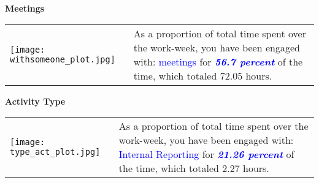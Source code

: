 \documentclass[a4paper]{article}
\begin{document}
\newpage

\begin{center}
\Large{\textbf{Meetings}}
 \end{center}

\begin{table}[h!]
     \begin{center}
     \begin{tabular}{m{10cm} m{7cm}}
     \begin {minipage} {10cm}
     \texttt{[image: withsomeone\_plot.jpg]}
     \end{minipage}
      & 
      \begin{minipage}{7cm}
      \Large{As a proportion of total time spent over the work-week, you have been engaged with: \textcolor{blue}{meetings} for \textbf{\textcolor{blue}{\emph{56.7 percent}}} of the time, which totaled 72.05 hours.}
      \end{minipage}
      \end{tabular}
      \end{center}
      \end{table}

\begin{center}
\Large{\textbf{Activity Type}}
 \end{center}
\begin{table}[h!]
     \begin{center}
     \begin{tabular}{m{10cm} m{7cm}}
     \begin {minipage} {10cm}
     \texttt{[image: type\_act\_plot.jpg]}
     \end{minipage}
      & 
      \begin{minipage}{7cm}
      \Large{As a proportion of total time spent over the work-week, you have been engaged with: \textcolor{blue}{Internal Reporting} for \textbf{\textcolor{blue}{\emph{21.26 percent}}} of the time, which totaled 2.27 hours.}
      \end{minipage}
      \end{tabular}
      \end{center}
      \end{table}
\end{document}
